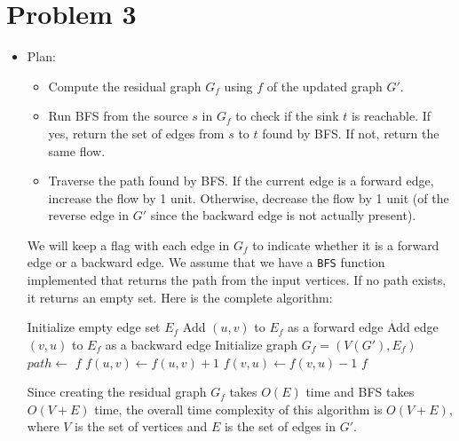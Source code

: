 \documentclass{article}
\begin{document}
\section{Problem 3}
  \begin{itemize}
    \item[(a)] Plan:
    \begin{itemize}
      \item Compute the residual graph $G_f$ using $f$ of the updated graph $G'$.
      \item Run BFS from the source $s$ in $G_f$ to check if the sink $t$ is reachable.
      If yes, return the set of edges from $s$ to $t$ found by BFS.
      If not, return the same flow.
      \item Traverse the path found by BFS. If the current edge is a forward edge, increase the flow by 1 unit.
      Otherwise, decrease the flow by 1 unit (of the reverse edge in $G'$ since the backward edge is not actually present).
    \end{itemize}
    We will keep a flag with each edge in $G_f$ to indicate whether it is a forward edge or a backward edge.
    We assume that we have a \texttt{BFS} function implemented that returns the path from the input vertices.
    If no path exists, it returns an empty set.
    Here is the complete algorithm:
    \begin{algorithm}[H]
      \caption{Update Flow}
      \begin{algorithmic}[1]
          \State Initialize empty edge set $E_f$
             
              \State Add $(u, v)$ to $E_f$ as a forward edge
            \EndIf
              \State Add edge $(v, u)$ to $E_f$ as a backward edge
            \EndIf
          \EndFor
          \State Initialize graph $G_f = (V(G'), E_f)$ 
          \State $path \gets$ 
            \State \Return $f$
          \EndIf
              \State $f(u, v) \gets f(u, v) + 1$
            \Else
              \State $f(v, u) \gets f(v, u) - 1$
            \EndIf
          \EndFor
          \State \Return $f$
        \EndFunction
      \end{algorithmic}
    \end{algorithm}
    Since creating the residual graph $G_f$ takes $O(E)$ time and BFS takes $O(V + E)$ time, the overall time complexity of this algorithm is $O(V + E)$, where $V$ is the set of vertices and $E$ is the set of edges in $G'$.


\end{itemize}
\end{document}
